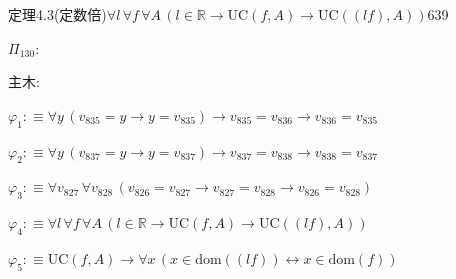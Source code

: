 \begin{fullproof}{定理4.3(定数倍)}{$\forall l\,\forall f\,\forall A\,(l \in \mathbb{R} \to \mathrm{UC}(f,A) \to \mathrm{UC}((l f),A))$}{639}
\begin{ptree}
\noLine
{}
\end{ptree}
\noindent$\Pi_{130}$:
\begin{ptree}
\noLine
{}
\noLine
{}
\end{ptree}
\noindent 主木:
\begin{ptree}
\noLine
{}
\noLine
{}
\end{ptree}
\begin{abbrevlist}
\item $\varphi_{1} :\equiv \forall y\,(v_{835} = y \to y = v_{835}) \to v_{835} = v_{836} \to v_{836} = v_{835}$
\item $\varphi_{2} :\equiv \forall y\,(v_{837} = y \to y = v_{837}) \to v_{837} = v_{838} \to v_{838} = v_{837}$
\item $\varphi_{3} :\equiv \forall v_{827}\,\forall v_{828}\,(v_{826} = v_{827} \to v_{827} = v_{828} \to v_{826} = v_{828})$
\item $\varphi_{4} :\equiv \forall l\,\forall f\,\forall A\,(l \in \mathbb{R} \to \mathrm{UC}(f,A) \to \mathrm{UC}((l f),A))$
\item $\varphi_{5} :\equiv \mathrm{UC}(f,A) \to \forall x\,(x \in \mathrm{dom}((l f)) \leftrightarrow x \in \mathrm{dom}(f))$

\end{abbrevlist}
\end{fullproof}
